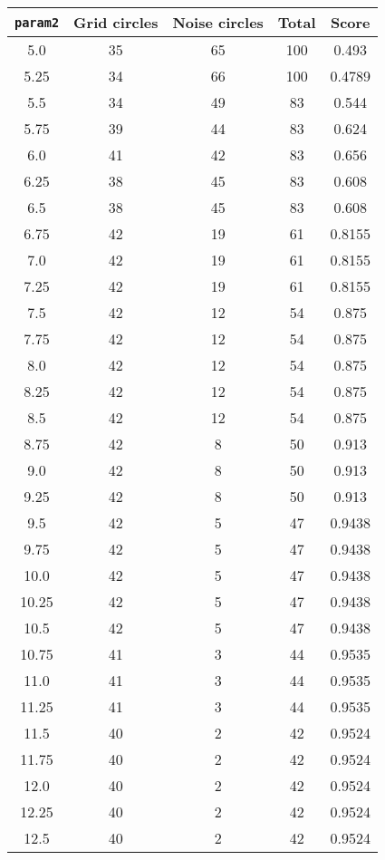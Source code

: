 \documentclass[letterpaper, 12pt]{article}
\begin{document}
\begin{longtable}{|c|c|c|c|c|}
\hline
\textbf{\texttt{param2}} & \textbf{Grid circles} & \textbf{Noise circles} & \textbf{Total} & \textbf{Score} \\
\hline
5.0 & 35 & 65 & 100 & 0.493 \\
\hline
5.25 & 34 & 66 & 100 & 0.4789 \\
\hline
5.5 & 34 & 49 & 83 & 0.544 \\
\hline
5.75 & 39 & 44 & 83 & 0.624 \\
\hline
6.0 & 41 & 42 & 83 & 0.656 \\
\hline
6.25 & 38 & 45 & 83 & 0.608 \\
\hline
6.5 & 38 & 45 & 83 & 0.608 \\
\hline
6.75 & 42 & 19 & 61 & 0.8155 \\
\hline
7.0 & 42 & 19 & 61 & 0.8155 \\
\hline
7.25 & 42 & 19 & 61 & 0.8155 \\
\hline
7.5 & 42 & 12 & 54 & 0.875 \\
\hline
7.75 & 42 & 12 & 54 & 0.875 \\
\hline
8.0 & 42 & 12 & 54 & 0.875 \\
\hline
8.25 & 42 & 12 & 54 & 0.875 \\
\hline
8.5 & 42 & 12 & 54 & 0.875 \\
\hline
8.75 & 42 & 8 & 50 & 0.913 \\
\hline
9.0 & 42 & 8 & 50 & 0.913 \\
\hline
9.25 & 42 & 8 & 50 & 0.913 \\
\hline
9.5 & 42 & 5 & 47 & 0.9438 \\
\hline
9.75 & 42 & 5 & 47 & 0.9438 \\
\hline
10.0 & 42 & 5 & 47 & 0.9438 \\
\hline
10.25 & 42 & 5 & 47 & 0.9438 \\
\hline
10.5 & 42 & 5 & 47 & 0.9438 \\
\hline
10.75 & 41 & 3 & 44 & 0.9535 \\
\hline
11.0 & 41 & 3 & 44 & 0.9535 \\
\hline
11.25 & 41 & 3 & 44 & 0.9535 \\
\hline
11.5 & 40 & 2 & 42 & 0.9524 \\
\hline
11.75 & 40 & 2 & 42 & 0.9524 \\
\hline
12.0 & 40 & 2 & 42 & 0.9524 \\
\hline
12.25 & 40 & 2 & 42 & 0.9524 \\
\hline
12.5 & 40 & 2 & 42 & 0.9524 \\

\end{longtable}
\end{document}
